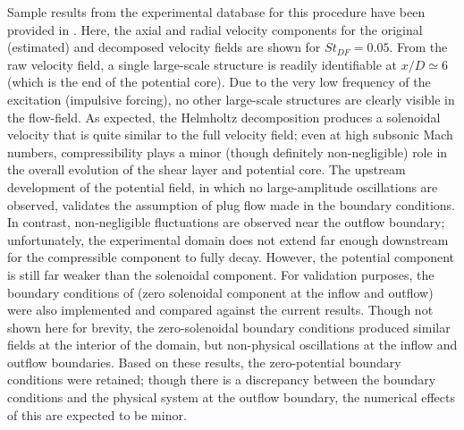 Sample results from the experimental database for this procedure have been provided in .
Here, the axial and radial velocity components for the original (estimated) and decomposed velocity fields are shown for $St_{DF}=0.05$.
From the raw velocity field, a single large-scale structure is readily identifiable at $x/D \simeq 6$ (which is the end of the potential core).
Due to the very low frequency of the excitation (impulsive forcing), no other large-scale structures are clearly visible in the flow-field.
As expected, the Helmholtz decomposition produces a solenoidal velocity that is quite similar to the full velocity field; even at high subsonic Mach numbers, compressibility plays a minor (though definitely non-negligible) role in the overall evolution of the shear layer and potential core.
The upstream development of the potential field, in which no large-amplitude oscillations are observed, validates the assumption of plug flow made in the boundary conditions.
In contrast, non-negligible fluctuations are observed near the outflow boundary; unfortunately, the experimental domain does not extend far enough downstream for the compressible component to fully decay.
However, the potential component is still far weaker than the solenoidal component.
For validation purposes, the boundary conditions of \citet{Unnikrishnan2015} (zero solenoidal component at the inflow and outflow) were also implemented and compared against the current results.
Though not shown here for brevity, the zero-solenoidal boundary conditions produced similar fields at the interior of the domain, but non-physical oscillations at the inflow and outflow boundaries.
Based on these results, the zero-potential boundary conditions were retained; though there is a discrepancy between the boundary conditions and the physical system at the outflow boundary, the numerical effects of this are expected to be minor.

